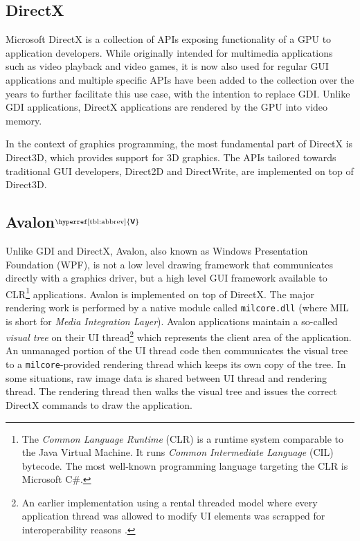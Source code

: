 \documentclass[10pt,twocolumn,a4paper]{article}
\newcommand{\bs}[1]{\textbf{\sffamily #1}}
\newcommand{\winver}[1]{$^{\text{\hyperref[tbl:abbrev]{\bs{#1}}}}$}
\newcommand{\winsubsection}[2]{\subsection[#1]{#1\winver{#2}}}
\begin{document}
		\subsection{DirectX} %
			Microsoft DirectX is a collection of APIs exposing functionality of
			a GPU to application developers. While originally intended for
			multimedia applications such as video playback and video games, it
			is now also used for regular GUI applications and multiple specific
			APIs have been added to the collection over the years to further
			facilitate this use case, with the intention to replace GDI.
			Unlike GDI applications, DirectX applications
			are rendered by the GPU into video memory. \cite{d2dvsgdi}

			In the context of graphics programming, the most fundamental part of
			DirectX is Direct3D, which provides support for 3D graphics. The
			APIs tailored towards traditional GUI developers, Direct2D and
			DirectWrite, are implemented on top of Direct3D.

		\winsubsection{Avalon}{V}\label{sec:milcore}
			Unlike GDI and DirectX, Avalon, also known as Windows Presentation
			Foundation (WPF),
			is not a low level drawing framework
			that communicates directly with a graphics driver, but a
			high level GUI framework available to CLR\footnote{The \textit{Common
			Language Runtime} (CLR) is a runtime system comparable to the Java Virtual
			Machine. It runs \textit{Common Intermediate Language} (CIL) bytecode.
			The most well-known programming language targeting the CLR is Microsoft
			C\#.} applications. Avalon is
			implemented on top of DirectX. The major rendering work is performed
			by a native module called \texttt{milcore.dll} (where MIL is short for
			\textit{Media Integration Layer}). Avalon applications maintain a
			so-called \textit{visual tree} on their UI thread\footnote{An
			earlier implementation using a rental threaded model where every
			application thread was allowed to modify UI elements was scrapped
			for interoperability reasons \cite{goingdeep}.} which represents the
			client area of the application. An unmanaged portion of the UI thread
			code then communicates the visual tree to a \texttt{milcore}-provided
			rendering thread which keeps its own copy of the tree. In some situations,
			raw image data is shared between UI thread and rendering thread. The
			rendering thread then walks the visual tree and issues the correct
			DirectX commands to draw the application.
			\cite{goingdeep,dwmwpf}
\end{document}
